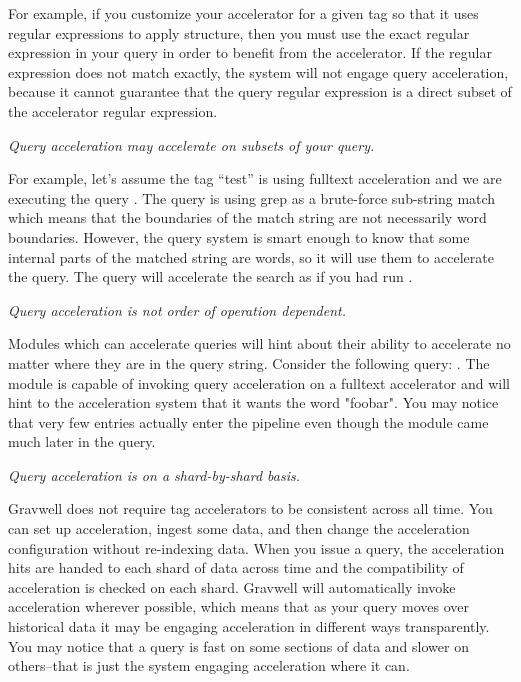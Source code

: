 {For example, if you customize your accelerator for a given tag so that it uses regular expressions to apply structure, then you must use the exact regular expression in your query in order to benefit from the accelerator.  If the regular expression does not match exactly, the system will not engage query acceleration, because it cannot guarantee that the query regular expression is a direct subset of the accelerator regular expression.

\textit{Query acceleration may accelerate on subsets of your query.}

For example, let's assume the tag ``test'' is using fulltext acceleration and we are executing the query .  The query is using grep as a brute-force sub-string match which means that the boundaries of the match string are not necessarily word boundaries.  However, the query system is smart enough to know that some internal parts of the matched string are words, so it will use them to accelerate the query.  The query will accelerate the search as if you had run .

\textit{Query acceleration is not order of operation dependent.}

Modules which can accelerate queries will hint about their ability to accelerate no matter where they are in the query string.  Consider the following query: .  The  module is capable of invoking query acceleration on a fulltext accelerator and will hint to the acceleration system that it wants the word "foobar".  You may notice that very few entries actually enter the pipeline even though the  module came much later in the query.

\textit{Query acceleration is on a shard-by-shard basis.}

Gravwell does not require tag accelerators to be consistent across all time. You can set up acceleration, ingest some data, and then change the acceleration configuration without re-indexing data.  When you issue a query, the acceleration hits are handed to each shard of data across time and the compatibility of acceleration is checked on each shard.  Gravwell will automatically invoke acceleration wherever possible, which means that as your query moves over historical data it may be engaging acceleration in different ways transparently.  You may notice that a query is fast on some sections of data and slower on others--that is just the system engaging acceleration where it can.

}
